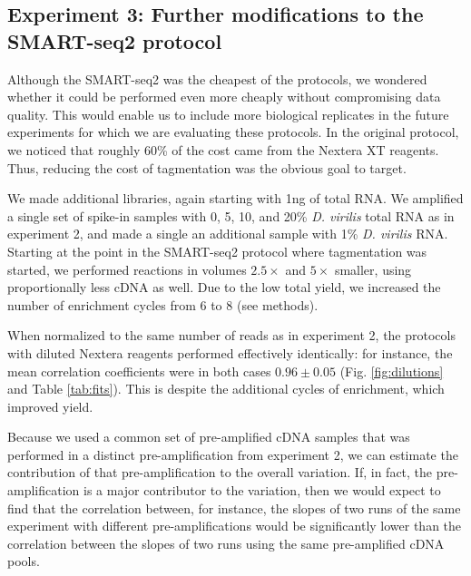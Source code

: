 \subsection{Experiment 3: Further modifications to the SMART-seq2 protocol}

Although the SMART-seq2 was the cheapest of the protocols, we wondered whether it could be performed even more cheaply without compromising data quality.  This would enable us to include more biological replicates in the future experiments for which we are evaluating these protocols.  In the original protocol, we noticed that roughly 60\% of the cost came from the Nextera XT reagents.  Thus, reducing the cost of tagmentation was the obvious goal to target.  

We made additional libraries, again starting with 1ng of total RNA.  We amplified a single set of spike-in samples with 0, 5, 10, and 20\% {\em D. virilis} total RNA as in experiment 2, and made a single an additional sample with 1\% {\em D. virilis} RNA. Starting at the point in the SMART-seq2 protocol where tagmentation was started, we performed reactions in volumes $2.5\times$ and $5\times$ smaller, using proportionally less cDNA as well.  Due to the low total yield, we increased the number of enrichment cycles from 6 to 8 (see methods). 

When normalized to the same number of reads as in experiment 2, the protocols with diluted Nextera reagents performed effectively identically: for instance, the mean correlation coefficients were in both cases $0.96 \pm 0.05$ (Fig. \ref{fig:dilutions} and Table \ref{tab:fits}).  This is despite the additional cycles of enrichment, which improved yield.

Because we used a common set of pre-amplified cDNA samples that was performed in a distinct pre-amplification from experiment 2, we can estimate the contribution of that pre-amplification to the overall variation. If, in fact, the pre-amplification is a major contributor to the variation, then we would expect to find that the correlation between, for instance, the slopes of two runs of the same experiment with different pre-amplifications would be significantly lower than the correlation between the slopes of two runs using the same pre-amplified cDNA pools. 
